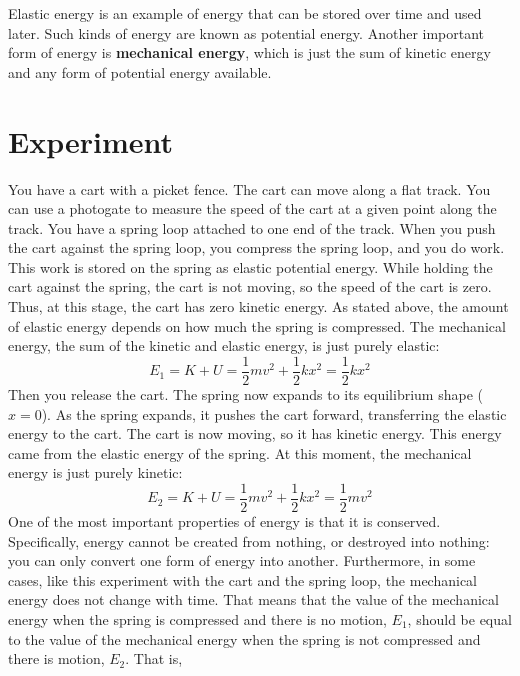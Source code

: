 Elastic energy is an example of energy that can be stored over time and used later. Such kinds of energy are known as potential energy. Another important form of energy is \textbf{mechanical energy}, which is just the sum of kinetic energy and any form of potential energy available.
\section{Experiment}
You have a cart with a picket fence. The cart can move along a flat track. You can use a photogate to measure the speed of the cart at a given point along the track. You have a spring loop attached to one end of the track. When you push the cart against the spring loop, you compress the spring loop, and you do work. This work is stored on the spring as elastic potential energy. While holding the cart against the spring, the cart is not moving, so the speed of the cart is zero. Thus, at this stage, the cart has zero kinetic energy. As stated above, the amount of elastic energy depends on how much the spring is compressed. The mechanical energy, the sum of the kinetic and elastic energy, is just purely elastic:
\begin{equation}
    E_{1} = K + U = \frac{1}{2} m v^{2} + \frac{1}{2} k x^{2} = \frac{1}{2} k x^{2}
\end{equation}
Then you release the cart. The spring now expands to its equilibrium shape ($x = 0$). As the spring expands, it pushes the cart forward, transferring the elastic energy to the cart. The cart is now moving, so it has kinetic energy. This energy came from the elastic energy of the spring. At this moment, the mechanical energy is just purely kinetic:
\begin{equation}
    E_{2} = K + U = \frac{1}{2} m v^{2} + \frac{1}{2} k x^{2} = \frac{1}{2} m v^{2}
\end{equation}
One of the most important properties of energy is that it is conserved. Specifically, energy cannot be created from nothing, or destroyed into nothing: you can only convert one form of energy into another. Furthermore, in some cases, like this experiment with the cart and the spring loop, the mechanical energy does not change with time. That means that the value of the mechanical energy when the spring is compressed and there is no motion, $E_{1}$, should be equal to the value of the mechanical energy when the spring is not compressed and there is motion, $E_{2}$. That is,
